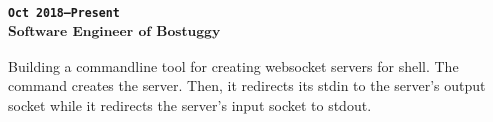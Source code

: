 \subsubsection{
\textsubscript{
\uppercase{\texttt{Oct 2018--Present}}\\
Software Engineer of Bostuggy
}
}
Building a commandline tool for creating websocket servers for shell.
The command creates the server.
Then, it redirects its stdin to the server's output socket while it redirects the server's input socket to stdout.
